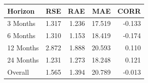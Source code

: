 \begin{tabular}{lrrrr}
\toprule
Horizon & RSE & RAE & MAE & CORR \\
\midrule
3 Months & 1.317 & 1.236 & 17.519 & -0.133 \\
6 Months & 1.310 & 1.153 & 18.419 & -0.174 \\
12 Months & 2.872 & 1.888 & 20.593 & 0.110 \\
24 Months & 1.231 & 1.273 & 18.248 & 0.121 \\
Overall & 1.565 & 1.394 & 20.789 & -0.013 \\
\bottomrule
\end{tabular}
